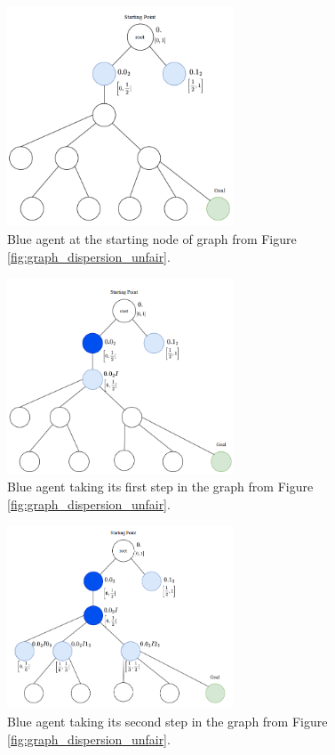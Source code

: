 \begin{figure}[H]
    \centering
    \includegraphics[width=0.6\textwidth]{Cap2/blue_agent_radix_0_step.png}
    \caption{Blue agent at the starting node of graph from Figure \ref{fig:graph_dispersion_unfair}.}
    \label{fig_blue_agent_step_0}
\end{figure}

\begin{figure}[H]
    \centering
    \includegraphics[width=0.6\textwidth]{Cap2/blue_agent_radix_1_step.png}
    \caption{Blue agent taking its first step in the graph from Figure \ref{fig:graph_dispersion_unfair}.}
    \label{fig_blue_agent_step_1}
\end{figure}

\begin{figure}[H]
    \centering
    \includegraphics[width=0.6\textwidth]{Cap2/blue_agent_radix_2_step.png}
    \caption{Blue agent taking its second step in the graph from Figure \ref{fig:graph_dispersion_unfair}.}
    \label{fig_blue_agent_step_2}
\end{figure}

